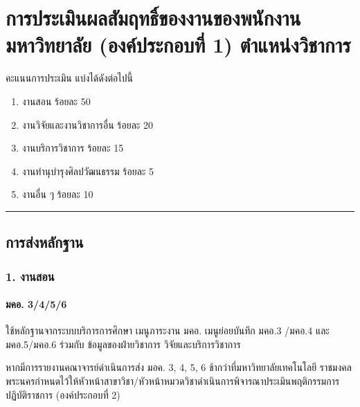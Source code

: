 \documentclass[a4paper,12pt,english]{sphinxmanual}
\begin{document}
\chapter{การประเมินผลสัมฤทธิ์ของงานของพนักงานมหาวิทยาลัย (องค์ประกอบที่ 1)  ตำแหน่งวิชาการ}
\label{\detokenize{submission_part1:id1}}\label{\detokenize{submission_part1::doc}}
คะแนนการประเมิน แบ่งได้ดังต่อไปนี้
\begin{enumerate}
%
\item {} 
งานสอน ร้อยละ 50

\item {} 
งานวิจัยและงานวิชาการอื่น ร้อยละ 20

\item {} 
งานบริการวิชาการ ร้อยละ 15

\item {} 
งานทำนุบำรุงศิลปวัฒนธรรม ร้อยละ 5

\item {} 
งานอื่น ๆ ร้อยละ 10

\end{enumerate}


\bigskip\hrule\bigskip



\section{การส่งหลักฐาน}
\label{\detokenize{submission_part1:id2}}

\subsection{1. งานสอน}
\label{\detokenize{submission_part1:id3}}

\subsubsection{มคอ. 3/4/5/6}
\label{\detokenize{submission_part1:id4}}
ใช้หลักฐานจากระบบบริการการศึกษา เมนูภาระงาน มคอ. เมนูย่อยบันทึก มคอ.3 /มคอ.4  และ มคอ.5/มคอ.6 ร่วมกับ ข้อมูลของฝ่ายวิชาการ วิจัยและบริการวิชาการ

หากมีการรายงานคณาจารย์ดำเนินการส่ง มอค. 3, 4, 5, 6 ช้ากว่าที่มหาวิทยาลัยเทคโนโลยี
ราชมงคลพระนครกำหนดไว้ให้หัวหน้าสาขาวิชา/หัวหน้าหมวดวิชาดำเนินการพิจารณาประเมินพฤติกรรมการปฏิบัติราชการ (องค์ประกอบที่ 2)
\end{document}
